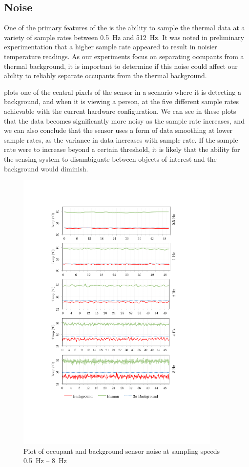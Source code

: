 \documentclass[../thesis/thesis.tex]{subfiles}
\begin{document}
\subsection{Noise}

One of the primary features of the \mlx is the ability to sample the thermal data at a variety of sample rates between 0.5~Hz and 512~Hz. It was noted in preliminary experimentation that a higher sample rate appeared to result in noisier temperature readings. As our experiments focus on separating occupants from a thermal background, it is important to determine if this noise could affect our ability to reliably separate occupants from the thermal background.

 plots one of the central pixels of the sensor in a scenario where it is detecting a background, and when it is viewing a person, at the five different sample rates achievable with the current hardware configuration. We can see in these plots that the data becomes significantly more noisy as the sample rate increases, and we can also conclude that the sensor uses a form of data smoothing at lower sample rates, as the variance in data increases with sample rate. If the sample rate were to increase beyond a certain threshold, it is likely that the ability for the sensing system to disambiguate between objects of interest and the background would diminish.

\begin{figure}
  \centering
  \includegraphics[width=0.9\textwidth]{../diagrams/noise-graph3.pdf}
  \caption{Plot of occupant and background sensor noise at sampling speeds 0.5~Hz -- 8~Hz}
  \label{fig:noise}
\end{figure}
\end{document}
